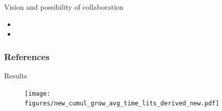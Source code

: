 \documentclass[handout]{beamer}
\begin{document}
	\begin{frame}{ Vision and possibility of collaboration}
	\begin{itemize}
		\item
		\item 
	\end{itemize}	
	\end{frame}
	
	\begin{frame}[allowframebreaks]
		\frametitle{References}
		
		
	\end{frame}
	
	\begin{frame}{Results}
			\begin{figure}
			\texttt{[image: figures/new\_cumul\_grow\_avg\_time\_lits\_derived\_new.pdf]}
		\end{figure}

	\end{frame}
	
\end{document}
